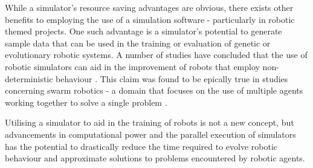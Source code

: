 While a simulator's resource saving advantages are obvious, there exists other
benefits to employing the use of a simulation software - particularly in
robotic themed projects.
One such advantage is a simulator's potential to generate sample data that can
be used in the training or evaluation of genetic or evolutionary robotic
systems.
A number of studies have concluded that the use of robotic simulators can
aid in the improvement of robots that employ non-deterministic behaviour
\cite{7139550,7139557}.
This claim was found to be epically true in studies concerning swarm robotics
- a domain that focuses on the use of multiple agents working together to solve
a single problem \cite{Wischmann864,R2016,Yao2014}.

Utilising a simulator to aid in the training of robots is not a new concept,
but advancements in computational power and the parallel execution of
simulators has the potential to drastically reduce the time required to evolve
robotic behaviour and approximate solutions to problems encountered by robotic
agents.

